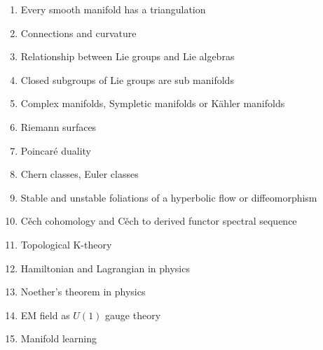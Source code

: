 \documentclass{article}
\theoremstyle{definition}
\begin{document}
\begin{enumerate}
    \item Every smooth manifold has a triangulation 
    \item Connections and curvature 
    \item Relationship between Lie groups and Lie algebras
    \item Closed subgroups of Lie groups are sub manifolds
    \item Complex manifolds, Sympletic manifolds or Kähler manifolds
    \item Riemann surfaces
    \item Poincar\'e duality
    \item Chern classes, Euler classes
    \item Stable and unstable foliations of a hyperbolic flow or diffeomorphism
    \item C\v ech cohomology and C\v ech to derived functor spectral sequence
    \item Topological K-theory
    \item Hamiltonian and Lagrangian in physics 
    \item Noether's theorem in physics 
    \item EM field as $U(1)$ gauge theory 
    \item Manifold learning
\end{enumerate}
\end{document}
